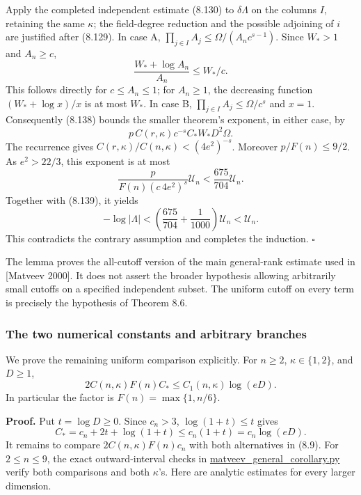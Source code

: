 \documentclass[
  11pt,
  a4paper,
]{article}
\begin{document}
Apply the completed independent estimate (8.130) to \(\delta\Lambda\) on
the columns \(I\), retaining the same \(\kappa\); the field-degree
reduction and the possible adjoining of \(i\) are justified after
(8.129). In case A, \(\prod_{j\in I}A_j\le\Omega/(A_nc^{s-1})\). Since
\(W_*>1\) and \(A_n\ge c\), \[
\frac{W_*+\log A_n}{A_n}\le W_*/c .
\] This follows directly for \(c\le A_n\le1\); for \(A_n\ge1\), the
decreasing function \((W_*+\log x)/x\) is at most \(W_*\). In case B,
\(\prod_{j\in I}A_j\le\Omega/c^s\) and \(x=1\). Consequently (8.138)
bounds the smaller theorem's exponent, in either case, by \[
p\,C(r,\kappa)c^{-s}C_*W_*D^2\Omega.
\] The recurrence gives \(C(r,\kappa)/C(n,\kappa)<
(4e^2)^{-s}\). Moreover \(p/F(n)\le9/2\). As \(e^2>22/3\), this exponent
is at most \[
\frac{p}{F(n)(c\,4e^2)^s}\mathcal U_n
<\frac{675}{704}\mathcal U_n.
\] Together with (8.139), it yields \[
-\log|\Lambda|
<\left(\frac{675}{704}+\frac1{1000}\right)\mathcal U_n
<\mathcal U_n.
\] This contradicts the contrary assumption and completes the induction.
\(\square\)

The lemma proves the all-cutoff version of the main general-rank
estimate used in {[}Matveev 2000{]}. It does not assert the broader
hypothesis allowing arbitrarily small cutoffs on a specified independent
subset. The uniform cutoff on every term is precisely the hypothesis of
Theorem 8.6.

\subsubsection{The two numerical constants and arbitrary
branches}\label{the-two-numerical-constants-and-arbitrary-branches}

We prove the remaining uniform comparison explicitly. For \(n\ge2\),
\(\kappa\in\{1,2\}\), and \(D\ge1\), \[
2C(n,\kappa)F(n)C_*
\le C_1(n,\kappa)\log(eD).
\tag{8.140}
\] In particular the factor is \(F(n)=\max\{1,n/6\}\).

\textbf{Proof.} Put \(t=\log D\ge0\). Since \(c_n>3\),
\(\log(1+t)\le t\) gives \[
C_*=c_n+2t+\log(1+t)\le c_n(1+t)=c_n\log(eD).
\] It remains to compare \(2C(n,\kappa)F(n)c_n\) with both alternatives
in (8.9). For \(2\le n\le9\), the exact outward-interval checks in
\href{https://kokunoyumeto.github.io/open-math-courses-public/courses/TR-BAKER/verification/matveev_general_corollary.py}{matveev\_general\_corollary.py}
verify both comparisons and both \(\kappa\)'s. Here are analytic
estimates for every larger dimension.
\end{document}
